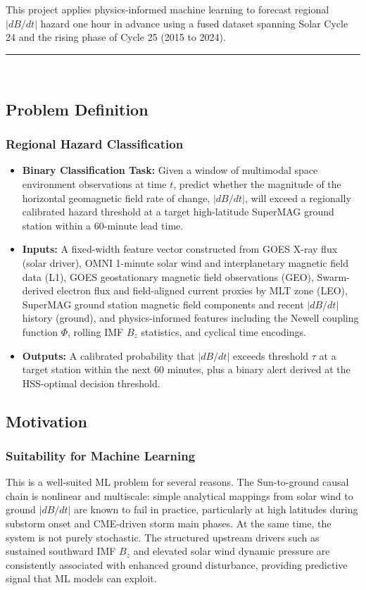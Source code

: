 \documentclass{article}
\begin{document}
\noindent This project applies physics-informed machine learning to forecast regional $|dB/dt|$ hazard one hour in advance using a fused dataset spanning Solar Cycle 24 and the rising phase of Cycle 25 (2015 to 2024).

\noindent\rule{\textwidth}{0.4pt}\\

\subsection*{Problem Definition}

\subsubsection*{Regional Hazard Classification}
\begin{itemize}
  \item \textbf{Binary Classification Task:} Given a window of multimodal space environment observations at time $t$, predict whether the magnitude of the horizontal geomagnetic field rate of change, $|dB/dt|$, will exceed a regionally calibrated hazard threshold at a target high-latitude SuperMAG ground station within a 60-minute lead time.
  \item \textbf{Inputs:} A fixed-width feature vector constructed from GOES X-ray flux (solar driver), OMNI 1-minute solar wind and interplanetary magnetic field data (L1), GOES geostationary magnetic field observations (GEO), Swarm-derived electron flux and field-aligned current proxies by MLT zone (LEO), SuperMAG ground station magnetic field components and recent $|dB/dt|$ history (ground), and physics-informed features including the Newell coupling function $\Phi$, rolling IMF $B_z$ statistics, and cyclical time encodings.
  \item \textbf{Outputs:} A calibrated probability that $|dB/dt|$ exceeds threshold $\tau$ at a target station within the next 60 minutes, plus a binary alert derived at the HSS-optimal decision threshold.
\end{itemize}

\subsection*{Motivation}

\subsubsection*{Suitability for Machine Learning}
This is a well-suited ML problem for several reasons. The Sun-to-ground causal chain is nonlinear and multiscale: simple analytical mappings from solar wind to ground $|dB/dt|$ are known to fail in practice, particularly at high latitudes during substorm onset and CME-driven storm main phases. At the same time, the system is not purely stochastic. The structured upstream drivers such as sustained southward IMF $B_z$ and elevated solar wind dynamic pressure are consistently associated with enhanced ground disturbance, providing predictive signal that ML models can exploit.\\
\end{document}
